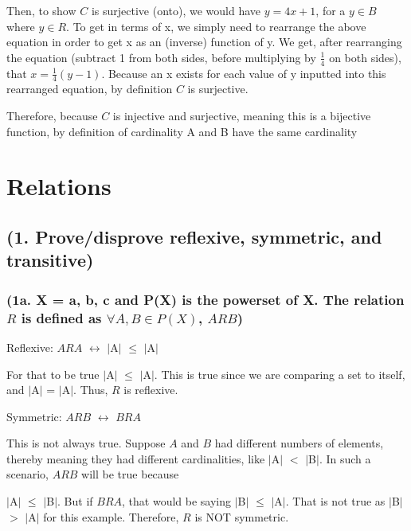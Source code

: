 \documentclass{article}
\begin{document}
\noindent Then, to show $C$ is surjective (onto), we would have $y = 4x + 1$, for a $y \in B$ where $y \in R$.  To get in terms of x, we simply need to rearrange the above equation in order to get x as an (inverse) function of y.  We get, after rearranging the equation (subtract 1 from both sides, before multiplying by $\frac{1}{4}$ on both sides), that $x = \frac{1}{4} (y - 1)$.  Because an x exists for each value of y inputted into this rearranged equation, by definition $C$ is surjective. \par\vspace{0.5cm}

\noindent Therefore, because $C$ is injective and surjective, meaning this is a bijective function, by definition of cardinality A and B have the same cardinality

\section{Relations}

\subsection{(1. Prove/disprove reflexive, symmetric, and transitive)}

\subsubsection{(1a. X = {a, b, c} and P(X) is the powerset of X. The relation $R$ is defined as $\forall A, B \in P(X)$, $A R B$)}

Reflexive: $ARA$ $\leftrightarrow$ $\mid$A$\mid$ $\leq$ $\mid$A$\mid$ \par\noindent
For that to be true $\mid$A$\mid$ $\leq$ $\mid$A$\mid$.  This is true since we are comparing a set to itself, and $\mid$A$\mid$ = $\mid$A$\mid$.  Thus, $R$ is reflexive. \par\vspace{0.5cm}

\noindent Symmetric: $ARB$ $\leftrightarrow$ $BRA$ \par\noindent
This is not always true.  Suppose $A$ and $B$ had different numbers of elements, thereby meaning they had different cardinalities, like $\mid$A$\mid$ $<$ $\mid$B$\mid$.  In such a scenario, $A R B$ will be true because \par\noindent $\mid$A$\mid$ $\leq$ $\mid$B$\mid$.  But if $B R A$, that would be saying $\mid$B$\mid$ $\leq$ $\mid$A$\mid$.  That is not true  as $\mid$B$\mid$ $>$ $\mid$A$\mid$ for this example.  Therefore, $R$ is NOT symmetric. \par\vspace{0.5cm}
\end{document}
